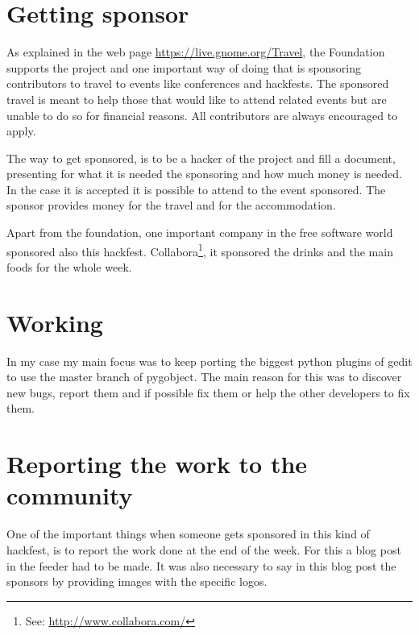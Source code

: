 \section{Getting sponsor}

As explained in the web page \url{https://live.gnome.org/Travel}, the \GNOME Foundation supports the \GNOME project and one important way of doing that is sponsoring contributors to travel to \GNOME events like conferences and hackfests. The sponsored travel is meant to help those that would like to attend \GNOME related events but are unable to do so for financial reasons. All \GNOME contributors are always encouraged to apply.

The way to get sponsored, is to be a hacker of the \GNOME project and fill a document, presenting for what it is needed the sponsoring and how much money is needed. In the case it is accepted it is possible to attend to the event sponsored. The sponsor provides money for the travel and for the accommodation.

Apart from the \GNOME foundation, one important company in the free software world sponsored also this hackfest. Collabora\footnote{See: \url{http://www.collabora.com/}}, it sponsored the drinks and the main foods for the whole week.

\section{Working}

In my case my main focus was to keep porting the biggest python plugins of gedit to use the master branch of pygobject. The main reason for this was to discover new bugs, report them and if possible fix them or help the other developers to fix them.

\newpage
\section{Reporting the work to the community}

One of the important things when someone gets sponsored in this kind of hackfest, is to report the work done at the end of the week. For this a blog post in the \GNOME feeder had to be made. It was also necessary to say in this blog post the sponsors by providing images with the specific logos.

